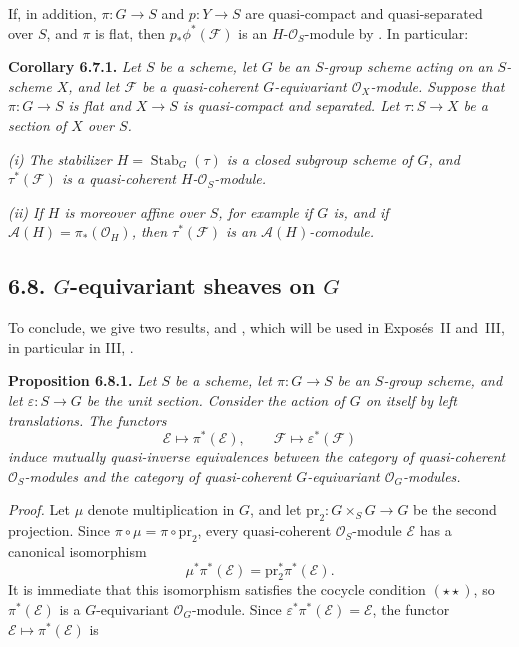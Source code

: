 If, in addition, \(\pi:G\to S\) and \(p:Y\to S\) are quasi-compact
and quasi-separated over \(S\), and \(\pi\) is flat, then
\(p_*\phi^*(\mathcal F)\) is an \(H\)-\(\mathcal O_S\)-module by
. In particular:

\medskip
\noindent{}\textbf{Corollary 6.7.1.}
\textit{Let \(S\) be a scheme, let \(G\) be an \(S\)-group scheme
acting on an \(S\)-scheme \(X\), and let \(\mathcal F\) be a
quasi-coherent \(G\)-equivariant \(\mathcal O_X\)-module. Suppose that
\(\pi:G\to S\) is flat and \(X\to S\) is quasi-compact and separated.
Let \(\tau:S\to X\) be a section of \(X\) over \(S\).}

\textit{(i) The stabilizer \(H=\operatorname{Stab}_G(\tau)\) is a
closed subgroup scheme of \(G\), and \(\tau^*(\mathcal F)\) is a
quasi-coherent \(H\)-\(\mathcal O_S\)-module.}

\textit{(ii) If \(H\) is moreover affine over \(S\), for example if
\(G\) is, and if \(\mathscr A(H)=\pi_*(\mathcal O_H)\), then
\(\tau^*(\mathcal F)\) is an \(\mathscr A(H)\)-comodule.}

\subsection*{6.8. \(G\)-equivariant sheaves on \(G\)}

To conclude, we give two results,  and , which will be used
in Expos\'es~II and~III, in particular in III, .

\medskip
\noindent{}\textbf{Proposition 6.8.1.}
\textit{Let \(S\) be a scheme, let \(\pi:G\to S\) be an \(S\)-group
scheme, and let \(\varepsilon:S\to G\) be the unit section. Consider
the action of \(G\) on itself by left translations. The functors}
\[
  \mathcal E\longmapsto\pi^*(\mathcal E),
  \qquad
  \mathcal F\longmapsto\varepsilon^*(\mathcal F)
\]
\textit{induce mutually quasi-inverse equivalences between the category
of quasi-coherent \(\mathcal O_S\)-modules and the category of
quasi-coherent \(G\)-equivariant \(\mathcal O_G\)-modules.}

\textit{Proof.}
Let \(\mu\) denote multiplication in \(G\), and let
\(\mathrm{pr}_2:G\times_SG\to G\) be the second projection. Since
\(\pi\circ\mu=\pi\circ\mathrm{pr}_2\), every quasi-coherent
\(\mathcal O_S\)-module \(\mathcal E\) has a canonical isomorphism
\[
  \mu^*\pi^*(\mathcal E)
  =\mathrm{pr}_2^*\pi^*(\mathcal E).
\]
It is immediate that this isomorphism satisfies the cocycle condition
 \((\star\star)\), so \(\pi^*(\mathcal E)\) is a
\(G\)-equivariant \(\mathcal O_G\)-module. Since
\(\varepsilon^*\pi^*(\mathcal E)=\mathcal E\), the functor
\(\mathcal E\mapsto\pi^*(\mathcal E)\) is

